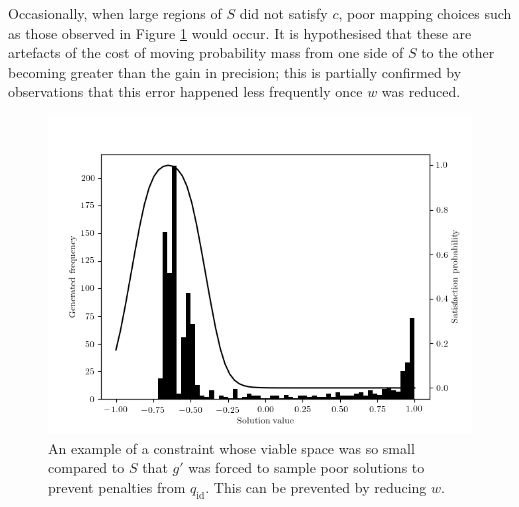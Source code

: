 \documentclass[../../main.tex]{subfiles}
\begin{document}
Occasionally, when large regions of $S$ did not satisfy $c$, poor mapping choices such as those observed in Figure \ref{fig:embeddedConstraintTooSparse} would occur.
It is hypothesised that these are artefacts of the cost of moving probability mass from one side of $S$ to the other becoming greater than the gain in precision; this is partially confirmed by observations that this error happened less frequently once $w$ was reduced.
\begin{figure}[H]
    \begin{center}
    \includegraphics[width=\textwidth]{embeddedConstraint4}
    \caption[Generator trained with excessive $w$]{
        An example of a constraint whose viable space was so small compared to $S$ that $g'$ was forced to sample poor solutions to prevent penalties from $q_\text{id}$.
        This can be prevented by reducing $w$.
    }
    \label{fig:embeddedConstraintTooSparse}
    \end{center}
\end{figure}
\end{document}
